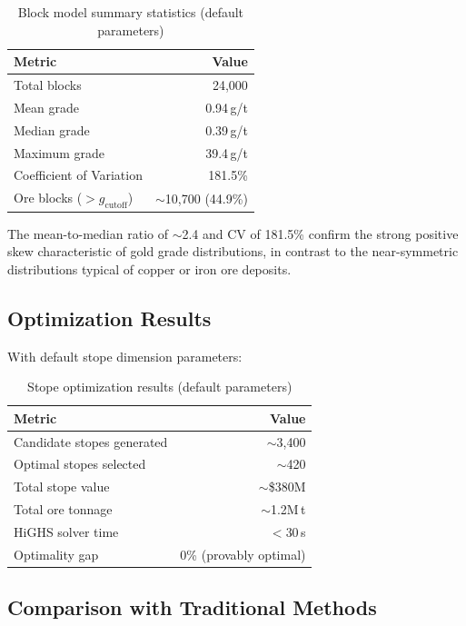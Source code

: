 \documentclass[12pt,a4paper]{article}
\begin{document}
\begin{table}[H]
\centering
\caption{Block model summary statistics (default parameters)}
\begin{tabular}{@{}lr@{}}
\toprule
\textbf{Metric} & \textbf{Value} \\
\midrule
Total blocks & 24{,}000 \\
Mean grade & 0.94\,g/t \\
Median grade & 0.39\,g/t \\
Maximum grade & 39.4\,g/t \\
Coefficient of Variation & 181.5\% \\
Ore blocks ($> g_{\text{cutoff}}$) & $\sim$10{,}700 (44.9\%) \\
\bottomrule
\end{tabular}
\end{table}

The mean-to-median ratio of $\sim$2.4 and CV of 181.5\% confirm the strong positive skew characteristic of gold grade distributions, in contrast to the near-symmetric distributions typical of copper or iron ore deposits.

\subsection{Optimization Results}

With default stope dimension parameters:

\begin{table}[H]
\centering
\caption{Stope optimization results (default parameters)}
\begin{tabular}{@{}lr@{}}
\toprule
\textbf{Metric} & \textbf{Value} \\
\midrule
Candidate stopes generated & $\sim$3{,}400 \\
Optimal stopes selected & $\sim$420 \\
Total stope value & $\sim$\$380M \\
Total ore tonnage & $\sim$1.2M\,t \\
HiGHS solver time & $<$30\,s \\
Optimality gap & 0\% (provably optimal) \\
\bottomrule
\end{tabular}
\end{table}

\subsection{Comparison with Traditional Methods}
\end{document}
